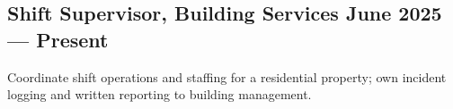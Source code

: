 \noindent{}

\subsection{{Shift Supervisor, Building Services \hfill June 2025 --- Present}}
\begin{zitemize}
    \item Coordinate shift operations and staffing for a residential property; own incident logging and written reporting to building management.
\end{zitemize}



